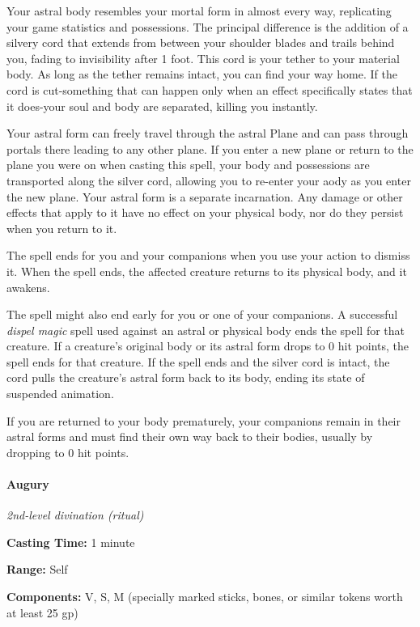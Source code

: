 \documentclass[
]{article}
\begin{document}
Your astral body resembles your mortal form in almost every way,
replicating your game statistics and possessions. The principal
difference is the addition of a silvery cord that extends from between
your shoulder blades and trails behind you, fading to invisibility after
1 foot. This cord is your tether to your material body. As long as the
tether remains intact, you can find your way home. If the cord is
cut-something that can happen only when an effect specifically states
that it does-your soul and body are separated, killing you instantly.

Your astral form can freely travel through the astral Plane and can pass
through portals there leading to any other plane. If you enter a new
plane or return to the plane you were on when casting this spell, your
body and possessions are transported along the silver cord, allowing you
to re-enter your aody as you enter the new plane. Your astral form is a
separate incarnation. Any damage or other effects that apply to it have
no effect on your physical body, nor do they persist when you return to
it.

The spell ends for you and your companions when you use your action to
dismiss it. When the spell ends, the affected creature returns to its
physical body, and it awakens.

The spell might also end early for you or one of your companions. A
successful \emph{dispel magic} spell used against an astral or physical
body ends the spell for that creature. If a creature's original body or
its astral form drops to 0 hit points, the spell ends for that creature.
If the spell ends and the silver cord is intact, the cord pulls the
creature's astral form back to its body, ending its state of suspended
animation.

If you are returned to your body prematurely, your companions remain in
their astral forms and must find their own way back to their bodies,
usually by dropping to 0 hit points.

\hypertarget{augury}{%
\paragraph{Augury}\label{augury}}

\emph{2nd-level divination (ritual)}

\textbf{Casting Time:} 1 minute

\textbf{Range:} Self

\textbf{Components:} V, S, M (specially marked sticks, bones, or similar
tokens worth at least 25 gp)
\end{document}
